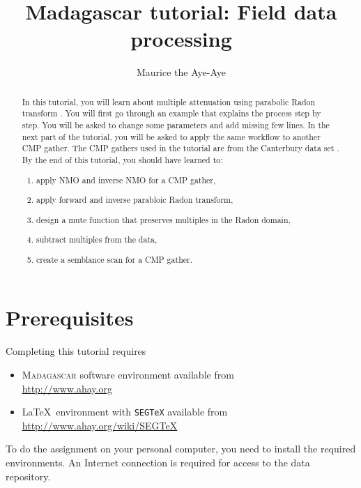 \author{Maurice the Aye-Aye}
\title{Madagascar tutorial: Field data processing}


\maketitle

\begin{abstract}
  In this tutorial, you will learn about multiple attenuation using parabolic Radon transform \cite[]{hampson86}. You will first go through an example that explains the process step by step. You will be asked to change some parameters and add missing few lines. In the next part of the tutorial, you will be asked to apply the same workflow to another CMP gather. The CMP gathers used in the tutorial are from the Canterbury data set \cite[]{cant2003}. By the end of this tutorial, you should have learned to:
  \begin{enumerate}
    \item apply NMO and inverse NMO for a CMP gather,
    \item apply forward and inverse parabloic Radon transform,
    \item design a mute function that preserves multiples in the Radon domain,
    \item subtract multiples from the data,
    \item create a semblance scan for a CMP gather.
  \end{enumerate}
\end{abstract}

\section{Prerequisites}

Completing this tutorial requires
\begin{itemize}
\item \textsc{Madagascar} software environment available from \\
\url{http://www.ahay.org}
\item \LaTeX\ environment with \texttt{SEGTeX} available from \\ 
\url{http://www.ahay.org/wiki/SEGTeX}
\end{itemize}
To do the assignment on your personal computer, you need to install
the required environments. An Internet connection is required for
access to the data repository.

